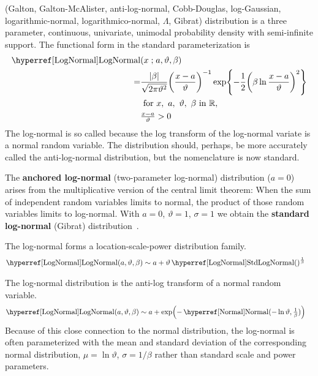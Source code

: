 

\label{sec:LogNormal}
 (Galton, Galton-McAlister, anti-log-normal, Cobb-Douglas, log-Gaussian, logarithmic-normal, logarithmico-normal, $\Lambda$, Gibrat) distribution \cite{Galton1879, McAlister1879, Johnson1994}
 is  a three parameter, continuous, univariate, unimodal probability density with semi-infinite support. The functional form in the standard  parameterization is
 \begin{align}
 \label{LogNormal}
\opr{LogNormal}&(x\given a, \vartheta,\beta) 
 \\ \notag = & \frac{|\beta|}{\sqrt{2\pi \vartheta^2}} \Left(\frac{x-a}{\vartheta}\Right)^{-1} \exp\Left\{-\frac{1}{2} \Left(\beta \ln \frac{x-a}{\vartheta} \Right)^2 \Right\}  \checked
\\ \notag
& \text{ for } x,\ a,\ \vartheta,\ \beta \  \text{in } \Real,  	
 \\ \nonumber
 & \tfrac{x-a}{\vartheta}>0
\end{align}
The log-normal is so called because the log transform of the log-normal variate is a normal random variable. The distribution should, perhaps, be more accurately called the anti-log-normal distribution, but the nomenclature is now standard. 



The {\bf anchored log-normal} (two-parameter log-normal) distribution ($a=0$) arises from the multiplicative version of the central limit theorem: When the sum of independent random variables limits to normal, the product of those random variables limits to log-normal.
With $a=0$, $\vartheta=1$, $\sigma=1$  we obtain the  {\bf standard log-normal} (Gibrat) distribution~\cite{Gibrat1931}.


The log-normal forms a location-scale-power distribution family.
\begin{align*}
\opr{LogNormal}(a, \vartheta, \beta) &\sim a+ \vartheta  \oprr{StdLogNormal}{LogNormal}()^{\frac{1}{\beta}}
\checked
\end{align*}


The log-normal distribution is the anti-log transform of a normal random variable. 
\begin{align*}
\opr{LogNormal}(a, \vartheta, \beta) &\sim a+ \exp\Bigl(- \opr{Normal}(-\ln \vartheta,\tfrac{1}{\beta})\Bigr) 
\checked
\end{align*}
Because of this close connection to the normal distribution, the log-normal is often parameterized with the mean and standard deviation of the corresponding normal distribution, $\mu=\ln \vartheta$, $\sigma=1/\beta$ rather than standard scale and power parameters. 


